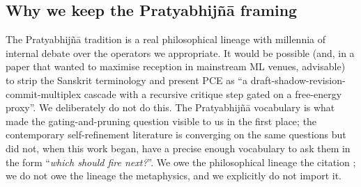 \subsection{Why we keep the Pratyabhij\~n\=a framing}

The Pratyabhij\~n\=a tradition is a real philosophical lineage with millennia of internal debate over the operators we appropriate. It would be possible (and, in a paper that wanted to maximise reception in mainstream ML venues, advisable) to strip the Sanskrit terminology and present PCE as ``a draft-shadow-revision-commit-multiplex cascade with a recursive critique step gated on a free-energy proxy''. We deliberately do not do this. The Pratyabhij\~n\=a vocabulary is what made the gating-and-pruning question visible to us in the first place; the contemporary self-refinement literature is converging on the same questions but did not, when this work began, have a precise enough vocabulary to ask them in the form ``\emph{which  should fire next?}''. We owe the philosophical lineage the citation \citep{Lawrence1996TantricArgumentPEW,abhinavagupta-isvarapratyabhijna,pratyabhijnahrdayam-singh}; we do not owe the lineage the metaphysics, and we explicitly do not import it.
